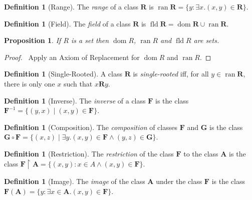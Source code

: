 \documentclass{report}
\let\qed\relax
\newtheorem{proposition}[axiom]{Proposition}
\theoremstyle{definition}
\newtheorem{definition}[axiom]{Definition}
\newcommand{\dom}{\ensuremath{\operatorname{dom}}}
\newcommand{\fld}{\ensuremath{\operatorname{fld}}}
\newcommand{\ran}{\ensuremath{\operatorname{ran}}}
\begin{document}
    \begin{definition}[Range]
        The \emph{range} of a class $\mathbf{R}$ is $\ran \mathbf{R} = \{ y : \exists x. (x,y) \in \mathbf{R} \}$.
    \end{definition}

    \begin{definition}[Field]
        The \emph{field} of a class $\mathbf{R}$ is $\fld \mathbf{R} = \dom \mathbf{R} \cup \ran \mathbf{R}$.
    \end{definition}

    \begin{proposition}
        If $R$ is a set then $\dom R$, $\ran R$ and $\fld R$ are sets.
    \end{proposition}

    \begin{proof}
        \pf\ Apply an Axiom of Replacement for $\dom R$ and $\ran R$. \qed
    \end{proof}
    
    \begin{definition}[Single-Rooted]
        A class $\mathbf{R}$ is \emph{single-rooted} iff, for all $y \in \ran \mathbf{R}$,
        there is only one $x$ such that $x \mathbf{R} y$.
    \end{definition}

    \begin{definition}[Inverse]
        The \emph{inverse} of a class $\mathbf{F}$ is the class $\mathbf{F}^{-1} = \{ (y,x)
        \mid (x,y) \in \mathbf{F} \}$.
    \end{definition}

    \begin{definition}[Composition]
        The \emph{composition} of classes $\mathbf{F}$ and $\mathbf{G}$ is the class
        $\mathbf{G} \circ \mathbf{F} = \{ (x,z) \mid \exists y. (x,y) \in \mathbf{F} \wedge (y,z) \in \mathbf{G} \}$.
    \end{definition}

    \begin{definition}[Restriction]
        The \emph{restriction} of the class $\mathbf{F}$ to the class $\mathbf{A}$ is the class
        $\mathbf{F} \restriction \mathbf{A} = \{ (x,y) : x \in A \wedge (x,y) \in \mathbf{F} \}$.
    \end{definition}

    \begin{definition}[Image]
        The \emph{image} of the class $\mathbf{A}$ under the class $\mathbf{F}$ is the class
        $\mathbf{F}(\mathbf{A}) = \{ y : \exists x \in \mathbf{A}. (x,y) \in \mathbf{F} \}$.
    \end{definition}
    
\end{document}
